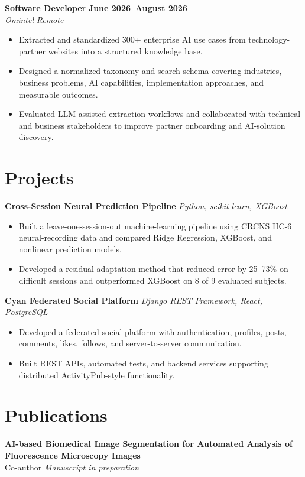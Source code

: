 \documentclass[10pt,letterpaper]{article}
\newcommand{\role}[4]{%
  \textbf{#1} \hfill \textbf{#2}\\[-1pt]
  \textit{#3} \hfill \textit{#4}\vspace{-2pt}
}
\newcommand{\project}[2]{%
  \textbf{#1} \hfill \textit{#2}\vspace{-2pt}
}
\begin{document}
\role{Software Developer}{June 2026--August 2026}{Omintel}{Remote}
\begin{itemize}
  \item Extracted and standardized 300+ enterprise AI use cases from technology-partner websites into a structured knowledge base.
  \item Designed a normalized taxonomy and search schema covering industries, business problems, AI capabilities, implementation approaches, and measurable outcomes.
  \item Evaluated LLM-assisted extraction workflows and collaborated with technical and business stakeholders to improve partner onboarding and AI-solution discovery.
\end{itemize}

\section{Projects}
\project{Cross-Session Neural Prediction Pipeline}{Python, scikit-learn, XGBoost}
\begin{itemize}
  \item Built a leave-one-session-out machine-learning pipeline using CRCNS HC-6 neural-recording data and compared Ridge Regression, XGBoost, and nonlinear prediction models.
  \item Developed a residual-adaptation method that reduced error by 25--73\% on difficult sessions and outperformed XGBoost on 8 of 9 evaluated subjects.
\end{itemize}

\project{Cyan Federated Social Platform}{Django REST Framework, React, PostgreSQL}
\begin{itemize}
  \item Developed a federated social platform with authentication, profiles, posts, comments, likes, follows, and server-to-server communication.
  \item Built REST APIs, automated tests, and backend services supporting distributed ActivityPub-style functionality.
\end{itemize}

\section{Publications}
\textbf{AI-based Biomedical Image Segmentation for Automated Analysis of Fluorescence Microscopy Images}\\[-1pt]
Co-author \hfill \textit{Manuscript in preparation}
\end{document}
